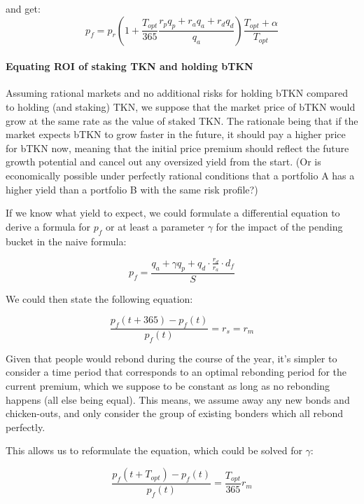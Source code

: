 \documentclass{article}
\begin{document}
and get:
\begin{equation}
  \label{eq:ROI-bonding-holding-2}
  p_f = p_r\left(1 + \frac{T_{opt}}{365} \frac{r_p q_p + r_a q_a + r_d q_d}{q_a}\right) \frac{T_{opt}+\alpha}{T_{opt}}
\end{equation}

\paragraph{Equating ROI of staking TKN and holding bTKN}
Assuming rational markets and no additional risks for holding bTKN compared to holding (and staking) TKN, we suppose that the market price of bTKN would grow at the same rate as the value of staked TKN. The rationale being that if the market expects bTKN to grow faster in the future, it should pay a higher price for bTKN now, meaning that the initial price premium should reflect the future growth potential and cancel out any oversized yield from the start. (Or is economically possible under perfectly rational conditions that a portfolio A has a higher yield than a portfolio B with the same risk profile?)

If we know what yield to expect, we could formulate a differential equation to derive a formula for $p_f$ or at least a parameter $\gamma$ for the impact of the pending bucket in the naive formula:

\begin{equation}
  \label{eq:naive-beta}
   p_f = \frac{q_a + \gamma q_p + q_d \cdot \frac{r_d}{r_a} \cdot d_f}{S}
\end{equation}

We could then state the following equation:

\begin{equation}
  \label{eq:yield-eq}
  \frac{p_f(t + 365) - p_f(t)}{p_f(t)} = r_s = r_m 
\end{equation}

Given that people would rebond during the course of the year, it’s simpler to consider a time period that corresponds to an optimal rebonding period for the current premium, which we suppose to be constant as long as no rebonding happens (all else being equal). This means, we assume away any new bonds and chicken-outs, and only consider the group of existing bonders which all rebond perfectly.

This allows us to reformulate the equation, which could be solved for $\gamma$:

\begin{equation}
  \label{eq:yield-eq}
  \frac{p_f(t + T_{opt}) - p_f(t)}{p_f(t)} = \frac{T_{opt}}{365} r_m
\end{equation}
\end{document}
